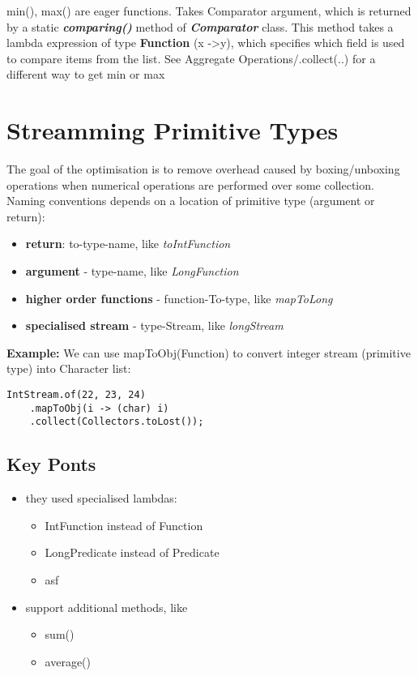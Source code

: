 \documentclass{report}
\begin{document}
min(), max() are eager functions. Takes Comparator argument, which is returned by a static \textbf{\textit{comparing()}} method of 
\textbf{\textit{Comparator}} class. This method takes a lambda expression of type \textbf{Function} (x -\textgreater  y), which specifies 
which field is used to compare items from the list. See Aggregate Operations/.collect(..) for a different way to get min or max

\chapter{Streamming Primitive Types}
The goal of the optimisation is to remove overhead caused by boxing/unboxing operations when numerical operations
are performed over some collection. Naming conventions depends on a location of primitive type
(argument or return):
\begin{itemize}
	\item \textbf{return}: to-type-name, like \textit{toIntFunction}
	\item \textbf{argument} - type-name, like \textit{LongFunction}
	\item \textbf{higher order functions} - function-To-type, like \textit{mapToLong}
	\item \textbf{specialised stream} - type-Stream, like \textit{longStream}
\end{itemize}
\textbf{Example:}
We can use mapToObj(Function) to convert integer stream (primitive type) into Character list:
\begin{verbatim}
IntStream.of(22, 23, 24)
    .mapToObj(i -> (char) i)
    .collect(Collectors.toLost());
\end{verbatim}

\section{Key Ponts}
\begin{itemize}
	\item they used specialised lambdas:
	\begin{itemize}
		\item IntFunction instead of Function
		\item LongPredicate instead of Predicate
		\item asf
	\end{itemize}
	\item support additional methods, like
	\begin{itemize}
		\item sum()
		\item average()
	\end{itemize}
\end{itemize}
\end{document}
